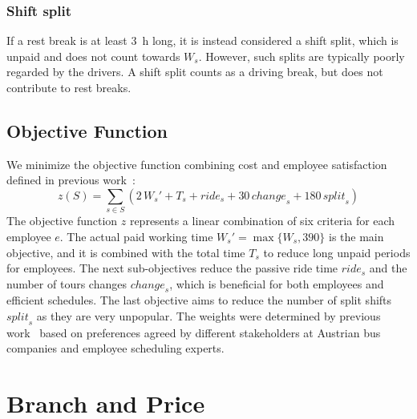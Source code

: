 \documentclass[]{amsart}
\theoremstyle{plain}
\begin{document}
\subsubsection{Shift split}
If a rest break is at least \qty{3}{\hour} long, it is instead considered a shift split, which is unpaid and does not count towards $W_s$. However, such splits are typically poorly regarded by the drivers. A shift split counts as a driving break, but does not contribute to rest breaks.
\subsection{Objective Function}
We minimize the objective function combining cost and employee satisfaction defined in previous work~\cite{kletzander2020solving}:
\begin{equation}
	\label{eq:objective}
	z(S)=\sum_{s \in S}\left(2\, W_s'+T_s+\mathit{ride}_s+30\, \mathit{change}_s+180\, \mathit{split}_s\right)
\end{equation}
\noindent
The objective function $z$ represents a linear combination of six criteria for each employee $e$. The actual paid working time $W_s'=\max\{W_s, 390\}$ is the main objective, and it is combined with the total time $T_s$ to reduce long unpaid periods for employees. The next sub-objectives reduce the passive ride time $\mathit{ride}_s$ and the number of tours changes $\mathit{change}_s$, which is beneficial for both employees and efficient schedules. The last objective aims to reduce the number of split shifts $\mathit{split}_s$ as they are very unpopular.
The weights were determined by previous work~\cite{kletzander2020solving} based on preferences agreed by different stakeholders at Austrian bus companies and employee scheduling experts.


\section{Branch and Price}
\label{sec:bp}
\end{document}
